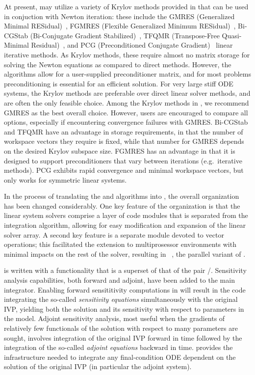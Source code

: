 At present, {\cvode} may utilize a variety of Krylov methods provided
in {\sundials} that can be used in conjuction with Newton iteration:
these include the GMRES (Generalized Minimal RESidual)~\cite{SaSc:86},
FGMRES (Flexible Generalized Minimum RESidual)~\cite{Saa:93},
Bi-CGStab (Bi-Conjugate Gradient Stabilized)~\cite{Van:92}, TFQMR
(Transpose-Free Quasi-Minimal Residual)~\cite{Fre:93}, and PCG
(Preconditioned Conjugate Gradient)~\cite{HeSt:52} linear iterative
methods.  As Krylov methods, these require almost no  
matrix storage for solving the Newton equations as compared to direct 
methods. However, the algorithms allow for a user-supplied preconditioner
matrix, and for most problems preconditioning is essential for an
efficient solution.
For very large stiff ODE systems, the Krylov methods are preferable over
direct linear solver methods, and are often the only feasible choice.
Among the Krylov methods in {\sundials}, we recommend GMRES as the
best overall choice.  However, users are encouraged to compare all
options, especially if encountering convergence failures with GMRES.
Bi-CGStab and TFQMR have an advantage in storage requirements, in
that the number of workspace vectors they require is fixed, while that
number for GMRES depends on the desired Krylov subspace size.  FGMRES
has an advantage in that it is designed to support preconditioners
that vary between iterations (e.g.~iterative methods).  PCG exhibits
rapid convergence and minimal workspace vectors, but only works for
symmetric linear systems.

In the process of translating the {\vode} and {\vodpk} algorithms into
{\CC}, the overall {\cvode} organization has been changed considerably.
One key feature of the {\cvode} organization is that the linear system
solvers comprise a layer of code modules that is separated from the
integration algorithm, allowing for easy modification and expansion of
the linear solver array.  A second key feature is a separate module
devoted to vector operations; this facilitated the extension to
multiprosessor environments with minimal impacts on the rest of the
solver, resulting in {\pvode}~\cite{ByHi:99},
the parallel variant of {\cvode}.  

{\cvodes} is written with a functionality that is a superset of that
of the pair {\cvode}/{\pvode}. Sensitivity analysis capabilities, both
forward and adjoint, have been added to the main integrator. Enabling
forward sensititivity computations in {\cvodes} will result in the
code integrating the so-called {\em sensitivity equations}
simultaneously with the original IVP, yielding both the solution and
its sensitivity with respect to parameters in the model. Adjoint
sensitivity analysis, most useful when the gradients of relatively few
functionals of the solution with respect to many parameters are
sought, involves integration of the original IVP forward in time
followed by the integration of the so-called {\em adjoint equations}
backward in time. {\cvodes} provides the infrastructure needed to
integrate any final-condition ODE dependent on the solution of the
original IVP (in particular the adjoint system).

